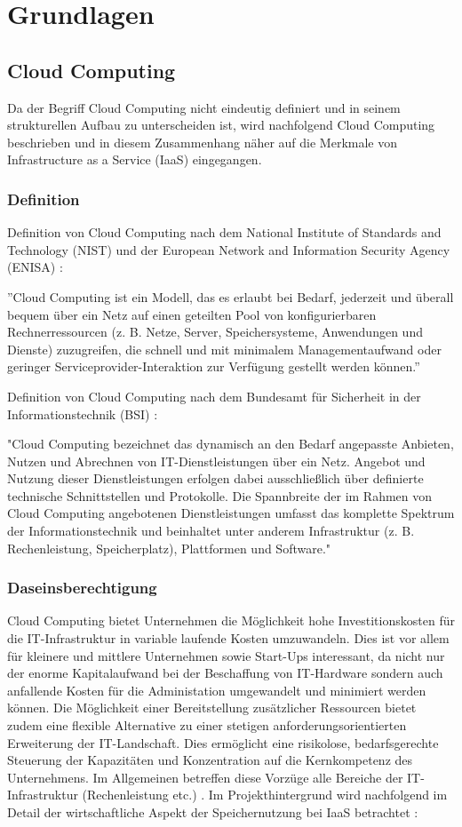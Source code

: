 \documentclass[12pt,a4paper,bibliography=totocnumbered,listof=totocnumbered]{scrartcl}
\begin{document}
\section{Grundlagen}\label{GrundlagenV}
\subsection{Cloud Computing}
Da der Begriff Cloud Computing nicht eindeutig definiert und in seinem strukturellen Aufbau zu unterscheiden ist, wird nachfolgend Cloud Computing beschrieben und in diesem Zusammenhang näher auf die Merkmale von Infrastructure as a Service (IaaS) eingegangen.
\subsubsection{Definition}
Definition von Cloud Computing nach dem National Institute of Standards and Technology (NIST) und der European Network and Information Security Agency (ENISA) \cite{34}:

''Cloud Computing ist ein Modell, das es erlaubt bei Bedarf, jederzeit und überall bequem über ein Netz auf einen geteilten Pool von konfigurierbaren Rechnerressourcen (z. B. Netze, Server, Speichersysteme, Anwendungen und Dienste) zuzugreifen, die schnell und mit minimalem Managementaufwand oder geringer Serviceprovider-Interaktion zur Verfügung gestellt werden können.''

Definition von Cloud Computing nach dem Bundesamt für Sicherheit in der Informationstechnik (BSI) \cite{35}:

"Cloud Computing bezeichnet das dynamisch an den Bedarf angepasste Anbieten, Nutzen und Abrechnen von IT-Dienstleistungen über ein Netz. Angebot und Nutzung dieser Dienstleistungen erfolgen dabei ausschließlich über definierte technische Schnittstellen und Protokolle. Die Spannbreite der im Rahmen von Cloud Computing angebotenen Dienstleistungen umfasst das komplette Spektrum der Informationstechnik und beinhaltet unter anderem Infrastruktur (z. B. Rechenleistung, Speicherplatz), Plattformen und Software."

\subsubsection{Daseinsberechtigung}\label{CloudV}
Cloud Computing bietet Unternehmen die Möglichkeit hohe Investitionskosten für die IT-Infrastruktur in variable laufende Kosten umzuwandeln. Dies ist vor allem für kleinere und mittlere Unternehmen sowie Start-Ups interessant, da nicht nur der enorme Kapitalaufwand bei der Beschaffung von IT-Hardware sondern auch anfallende Kosten für die Administation umgewandelt und minimiert werden können. Die Möglichkeit einer Bereitstellung zusätzlicher Ressourcen bietet zudem eine flexible Alternative zu einer stetigen anforderungsorientierten Erweiterung der IT-Landschaft. Dies ermöglicht eine risikolose, bedarfsgerechte Steuerung der Kapazitäten und Konzentration auf die Kernkompetenz des Unternehmens. Im Allgemeinen betreffen diese Vorzüge alle Bereiche der IT-Infrastruktur (Rechenleistung etc.) \cite[S. 35]{39}. Im Projekthintergrund wird nachfolgend im Detail der wirtschaftliche Aspekt der Speichernutzung bei IaaS betrachtet \cite[S. 35 ff.]{39}:
\end{document}
